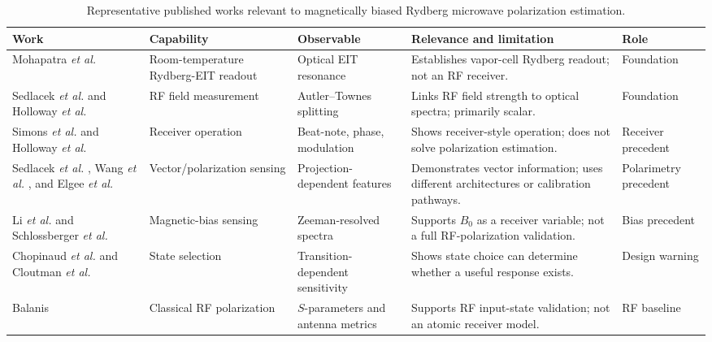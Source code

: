 \documentclass{ieeeaccess}
\begin{document}
\begin{table}[!t]
\caption{Representative published works relevant to magnetically biased Rydberg microwave polarization estimation.}
\label{tab:lit_representative_works}
\centering
\renewcommand{\arraystretch}{1.10}
\scriptsize
\begin{tabular}{p{} p{} p{} p{} p{}}
\hline
\textbf{Work} & \textbf{Capability} & \textbf{Observable} & \textbf{Relevance and limitation} & \textbf{Role} \\
\hline
Mohapatra \emph{et al.} \cite{Mohapatra2007} & Room-temperature Rydberg-EIT readout & Optical EIT resonance & Establishes vapor-cell Rydberg readout; not an RF receiver. & Foundation \\
Sedlacek \emph{et al.} \cite{Sedlacek2012} and Holloway \emph{et al.} \cite{Holloway2014} & RF field measurement & Autler--Townes splitting & Links RF field strength to optical spectra; primarily scalar. & Foundation \\
Simons \emph{et al.} \cite{Simons2019Mixer} and Holloway \emph{et al.} \cite{Holloway2019PhaseModReceiver} & Receiver operation & Beat-note, phase, modulation & Shows receiver-style operation; does not solve polarization estimation. & Receiver precedent \\
Sedlacek \emph{et al.} \cite{Sedlacek2013}, Wang \emph{et al.} \cite{Wang2023Polarization}, and Elgee \emph{et al.} \cite{Elgee2024Polarimetry} & Vector/polarization sensing & Projection-dependent features & Demonstrates vector information; uses different architectures or calibration pathways. & Polarimetry precedent \\
Li \emph{et al.} \cite{Li2023Magnetic} and Schlossberger \emph{et al.} \cite{Schlossberger2024Zeeman} & Magnetic-bias sensing & Zeeman-resolved spectra & Supports \(B_0\) as a receiver variable; not a full RF-polarization validation. & Bias precedent \\
Chopinaud \emph{et al.} \cite{Chopinaud2021Optimal} and Cloutman \emph{et al.} \cite{Cloutman2024PolarizationInsensitive} & State selection & Transition-dependent sensitivity & Shows state choice can determine whether a useful response exists. & Design warning \\
Balanis \cite{Balanis2016} & Classical RF polarization & \(S\)-parameters and antenna metrics & Supports RF input-state validation; not an atomic receiver model. & RF baseline \\
\hline
\end{tabular}
\end{table}
\end{document}
